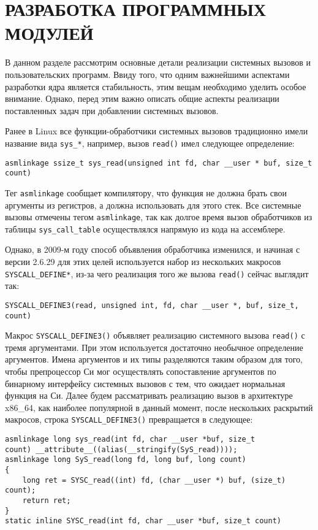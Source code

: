 \pagebreak
\section{РАЗРАБОТКА ПРОГРАММНЫХ МОДУЛЕЙ}
\label{sec:dev}

В данном разделе рассмотрим основные детали реализации системных вызовов и
пользовательских программ. Ввиду того, что одним важнейшими аспектами разработки
ядра является стабильность, этим вещам необходимо уделить особое внимание.
Однако, перед этим важно описать общие аспекты реализации поставленных задач при
добавлении системных вызовов.

Ранее в Linux все функции-обработчики системных вызовов традиционно имели
название вида \texttt{sys\_*}, например, вызов \texttt{read()} имел следующее
определение:
\medskip
\begin{lstlisting}[style=cstyle]
asmlinkage ssize_t sys_read(unsigned int fd, char __user * buf, size_t count)
\end{lstlisting}
\medskip

Тег \texttt{asmlinkage} сообщает компилятору, что функция не должна брать свои
аргументы из регистров, а должна использовать для этого стек. Все системные
вызовы отмечены тегом \texttt{asmlinkage}, так как долгое время вызов
обработчиков из таблицы \texttt{sys\_call\_table} осуществлялся напрямую из кода
на ассемблере.

Однако, в 2009-м году способ объявления обработчика изменился, и начиная с
версии 2.6.29 для этих целей используется набор из нескольких макросов
\texttt{SYSCALL\_DEFINE*}, из-за чего реализация того же вызова \texttt{read()}
сейчас выглядит так:
\medskip
\begin{lstlisting}[style=cstyle]
SYSCALL_DEFINE3(read, unsigned int, fd, char __user *, buf, size_t, count)
\end{lstlisting}
\medskip

Макрос \texttt{SYSCALL\_DEFINE3()} объявляет реализацию системного вызова
\texttt{read()} с тремя аргументами. При этом используется достаточно необычное
определение аргументов. Имена аргументов и их типы разделяются таким образом для
того, чтобы препроцессор Си мог осуществлять сопоставление аргументов по
бинарному интерфейсу системных вызовов с тем, что ожидает нормальная функция на
Си. Далее будем рассматривать реализацию вызов в архитектуре x86\_64, как
наиболее популярной в данный момент, после нескольких раскрытий макросов, строка
\texttt{SYSCALL\_DEFINE3()} превращается в следующее:
\medskip
\begin{lstlisting}[style=cstyle]
asmlinkage long sys_read(int fd, char __user *buf, size_t
count) __attribute__((alias(__stringify(SyS_read))));
asmlinkage long SyS_read(long fd, long buf, long count)
{
	long ret = SYSC_read((int) fd, (char __user *) buf, (size_t) count);
	return ret;
}
static inline SYSC_read(int fd, char __user *buf, size_t count)
\end{lstlisting}
\medskip

